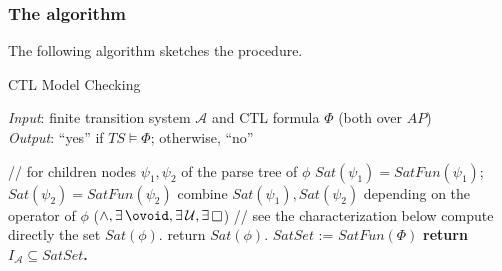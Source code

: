 \documentclass{article}
\begin{document}
\subsubsection{The algorithm}
The following algorithm sketches the procedure. 

\begin{algorithm}[H]
    \caption{CTL Model Checking}
    \hspace*{\algorithmicindent} \emph{Input}: finite transition system $\mathcal{A}$ and CTL formula $\Phi$ (both over $AP$) \\
    \hspace*{\algorithmicindent} \emph{Output}: ``yes'' if $TS \vDash \Phi$; otherwise, ``no''
    \begin{algorithmic}[1]
            \State // for children nodes $\psi_1, \psi_2$ of the parse tree of $\phi$
            \State $Sat(\psi_1) = SatFun(\psi_1)$; $Sat(\psi_2) = SatFun(\psi_2)$ 
            \State combine $Sat(\psi_1), Sat(\psi_2)$ depending on the operator of $\phi$ ($\land, \exists\lnext, \exists \, \mathbin{\mathcal{U}}, \exists\llglob$)
            \State // see the characterization below
        \Else
            \State compute directly the set $Sat(\phi)$.
        \EndIf
        \State return $Sat(\phi)$.
    \EndFunction
    \State
    \State $SatSet$ := $SatFun(\Phi)$
    \State \textbf{return $I_{\mathcal{A}} \subseteq SatSet$.}
    \end{algorithmic}
\end{algorithm}
\end{document}
